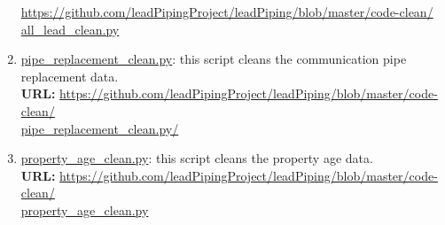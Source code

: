 \documentclass[11pt,twoside]{article}
\numberwithin{Theorem}{section}
\numberwithin{Definition}{section}
\numberwithin{Lemma}{section}
\numberwithin{Algorithm}{section}
\numberwithin{equation}{section}
\begin{document}
\begin{enumerate}
    \href{https://github.com/leadPipingProject/leadPiping/blob/master/code-clean/all_lead_clean.py}{https://github.com/leadPipingProject/leadPiping/blob/master/code-clean/\\all\_lead\_clean.py}
    \item \href{https://github.com/leadPipingProject/leadPiping/blob/master/code-clean/pipe_replacement_clean.py}{pipe\_replacement\_clean.py}: this script cleans the communication pipe replacement data.
    \\
    \textbf{URL: }
    \href{https://github.com/leadPipingProject/leadPiping/blob/master/code-clean/pipe_replacement_clean.py}{https://github.com/leadPipingProject/leadPiping/blob/master/code-clean/\\pipe\_replacement\_clean.py/}
    \item \href{https://github.com/leadPipingProject/leadPiping/blob/master/code-clean/property_age_clean.py}{property\_age\_clean.py}: this script cleans the property age data.
    \\
    \textbf{URL: }
    \href{https://github.com/leadPipingProject/leadPiping/blob/master/code-clean/property_age_clean.py}{https://github.com/leadPipingProject/leadPiping/blob/master/code-clean/\\property\_age\_clean.py}
\end{enumerate}
\end{document}
